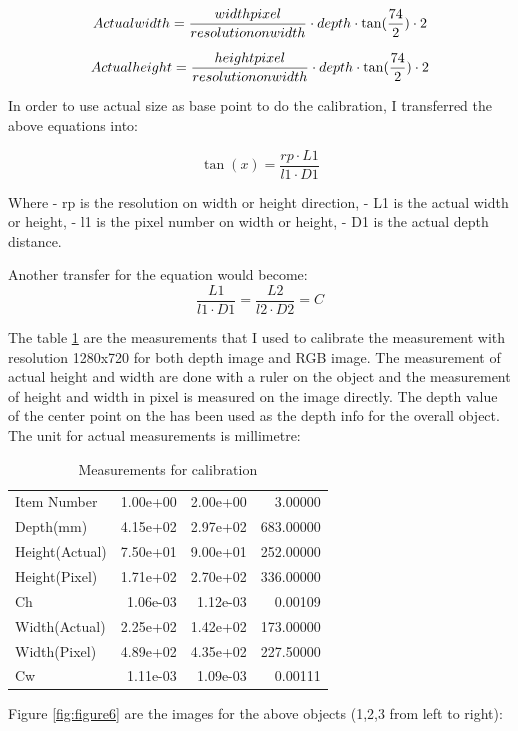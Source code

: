 \documentclass[
  oneside]{ubcthesis}
\begin{document}
\[ Actual width = \frac{width \space pixel}{resolution \space on \space width} \cdot depth \cdot \tan(\frac{74}{2}) \cdot 2 \]

\[ Actual height = \frac{height \space pixel}{resolution \space on \space width} \cdot depth \cdot \tan(\frac{74}{2}) \cdot 2 \]

In order to use actual size as base point to do the calibration, I transferred the above equations into:

\[ \tan(x) = \frac{rp \cdot L1}{l1 \cdot D1} \]

Where
- rp is the resolution on width or height direction,
- L1 is the actual width or height,
- l1 is the pixel number on width or height,
- D1 is the actual depth distance.

Another transfer for the equation would become:
\[\frac{L1}{l1 \cdot D1} = \frac{L2}{l2 \cdot D2} = C\]

The table \ref{tab:mytable1} are the measurements that I used to calibrate the measurement with resolution 1280x720 for both depth image and RGB image. The measurement of actual height and width are done with a ruler on the object and the measurement of height and width in pixel is measured on the image directly. The depth value of the center point on the has been used as the depth info for the overall object. The unit for actual measurements is millimetre:

\begin{table}

\caption{\label{tab:mytable1}Measurements for calibration}
\centering
\begin{tabular}[t]{lrrr}
\toprule
Item Number & 1.00e+00 & 2.00e+00 & 3.00000\\
Depth(mm) & 4.15e+02 & 2.97e+02 & 683.00000\\
Height(Actual) & 7.50e+01 & 9.00e+01 & 252.00000\\
Height(Pixel) & 1.71e+02 & 2.70e+02 & 336.00000\\
Ch & 1.06e-03 & 1.12e-03 & 0.00109\\
\addlinespace
Width(Actual) & 2.25e+02 & 1.42e+02 & 173.00000\\
Width(Pixel) & 4.89e+02 & 4.35e+02 & 227.50000\\
Cw & 1.11e-03 & 1.09e-03 & 0.00111\\
\bottomrule
\end{tabular}
\end{table}

Figure \ref{fig:figure6} are the images for the above objects (1,2,3 from left to right):
\end{document}
